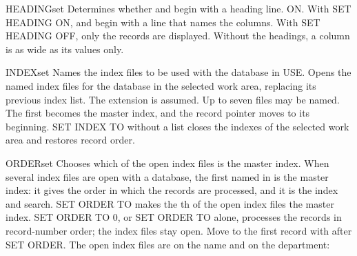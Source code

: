 \begin{XbaseEntry}{HEADING}{set}
Determines whether  and  begin with a heading line.
\Syntax
{}
\Defaults
ON.
\Usage
With SET HEADING ON,  and  begin with a line that names
the columns.  With SET HEADING OFF, only the records are displayed.  Without
the headings, a column is as wide as its values only.
\Examples
{}
\end{XbaseEntry}

\begin{XbaseEntry}{INDEX}{set}
Names the index files to be used with the database in USE.
\Syntax
{}
\Usage
Opens the named index files for the database in the selected work area,
replacing its previous index list.  The extension  is assumed.
Up to seven files may be named.  The first becomes the master index, and
the record pointer moves to its beginning.  SET INDEX TO without a list
closes the indexes of the selected work area and restores record order.
\Examples
{}
\end{XbaseEntry}

\begin{XbaseEntry}{ORDER}{set}
Chooses which of the open index files is the master index.
\Syntax
{}
\Usage
When several index files are open with a database, the first named in
 is the master index: it gives the order in which the records are
processed, and it is the index  and  search.  SET ORDER
TO  makes the th of the open index files the master index.  SET
ORDER TO 0, or SET ORDER TO alone, processes the records in record-number
order; the index files stay open.
\Tips
Move to the first record with  after SET ORDER.
\Examples
The open index files are on the name and on the department:
\end{XbaseEntry}

